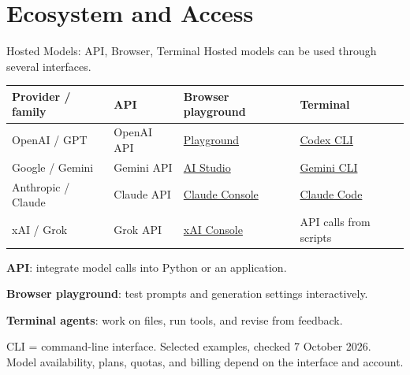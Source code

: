 \documentclass[aspectratio=169]{beamer}
\begin{document}
\section{Ecosystem and Access}

\begin{frame}{Hosted Models: API, Browser, Terminal}
  \small Hosted models can be used through several interfaces.
  \begin{center}
    {\footnotesize\renewcommand{\arraystretch}{1.25}
    \begin{tabular}{@{}>{\raggedright\arraybackslash}p{2.7cm}>{\raggedright\arraybackslash}p{2.3cm}>{\raggedright\arraybackslash}p{3.3cm}>{\raggedright\arraybackslash}p{2.7cm}@{}}
      \toprule
      \textbf{Provider / family} & \textbf{API} & \textbf{Browser playground} & \textbf{Terminal} \\
      \midrule
      OpenAI / GPT & OpenAI API & \href{https://platform.openai.com/playground}{Playground} & \href{https://learn.chatgpt.com/docs/codex/cli}{Codex CLI} \\
      Google / Gemini & Gemini API & \href{https://ai.google.dev/gemini-api/docs/ai-studio-quickstart}{AI Studio} & \href{https://github.com/google-gemini/gemini-cli}{Gemini CLI} \\
      Anthropic / Claude & Claude API & \href{https://platform.claude.com/docs/en/intro}{Claude Console} & \href{https://code.claude.com/docs/en/overview}{Claude Code} \\
      xAI / Grok & Grok API & \href{https://docs.x.ai/overview}{xAI Console} & API calls from scripts \\
      \bottomrule
    \end{tabular}}
  \end{center}
  \small \textbf{API}: integrate model calls into Python or an application.
  \par\vspace{0.35em}
  \textbf{Browser playground}: test prompts and generation settings interactively.
  \par\vspace{0.35em}
  \textbf{Terminal agents}: work on files, run tools, and revise from feedback.
  \par\vspace{0.45em}
  {\scriptsize CLI = command-line interface. Selected examples, checked 7 October 2026.\\
  Model availability, plans, quotas, and billing depend on the interface and account.}

\end{frame}
\end{document}
